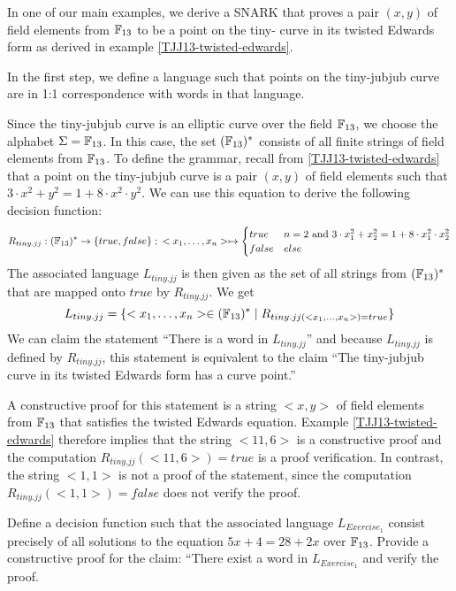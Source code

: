 \begin{example}\label{ex:tiny-jubjub} In one of our main examples, we derive a SNARK that proves a pair $(x,y)$ of field elements from $\mathbb{F}_{13}$ to be a point on the tiny- curve in its twisted Edwards form as derived in example \ref{TJJ13-twisted-edwards}.

In the first step, we define a language such that points on the tiny-jubjub curve are in 1:1 correspondence with words in that language.

Since the tiny-jubjub curve is an elliptic curve over the field $\mathbb{F}_{13}$, we choose the alphabet $\Sigma = \mathbb{F}_{13}$. In this case, the set $(\mathbb{F}_{13})^*$ consists of all finite strings of field elements from $\mathbb{F}_{13}$. To define the grammar, recall from \ref{TJJ13-twisted-edwards} that a point on the tiny-jubjub curve is a pair $(x,y)$ of field elements such that $3\cdot x^2 + y^2 = 1+ 8\cdot x^2\cdot y^2$. We can use this equation to derive the following decision function:
$$
R_{tiny.jj} : (\mathbb{F}_{13})^* \to \{true, false\}\;;\;
<x_1,\ldots,x_n> \mapsto
\begin{cases}
true & n=2 \text{ and } 3\cdot x_1^2 + x_2^2 = 1+ 8\cdot x_1^2\cdot x_2^2\\
false & else
\end{cases}
$$
The associated language $L_{tiny.jj}$ is then given as the set of all strings from $(\mathbb{F}_{13})^*$ that are mapped onto $true$ by $R_{tiny.jj}$. We get
$$
L_{tiny.jj} = \{<x_1,\ldots,x_n>\in (\mathbb{F}_{13})^*\;|\; R_{tiny.jj(<x_1,\ldots,x_n>)=true}\}
$$
We can claim the statement ``There is a word in $L_{tiny.jj}$'' and because $L_{tiny.jj}$ is defined by $R_{tiny.jj}$, this statement is equivalent to the claim ``The tiny-jubjub curve in its twisted Edwards form has a curve point.'' 

A constructive proof for this statement is a string $<x,y>$ of field elements from $\mathbb{F}_{13}$ that satisfies the twisted Edwards equation. Example \ref{TJJ13-twisted-edwards} therefore implies that the string $<11,6>$ is a constructive proof and the computation $R_{tiny.jj}(<11,6>)=true$ is a proof verification. In contrast, the string $<1,1>$ is not a proof of the statement, since the computation $R_{tiny.jj}(<1,1>)=false$ does not verify the proof.
\end{example}
\begin{exercise}
\label{ex:decision_function_1} Define a decision function such that the associated language $L_{Exercise_1}$ consist precisely of all solutions to the equation $5x + 4 = 28 + 2x$ over $\mathbb{F}_{13}$. Provide a constructive proof for the claim: ``There exist a word in $L_{Exercise_1}$ and verify the proof.  
\end{exercise}
